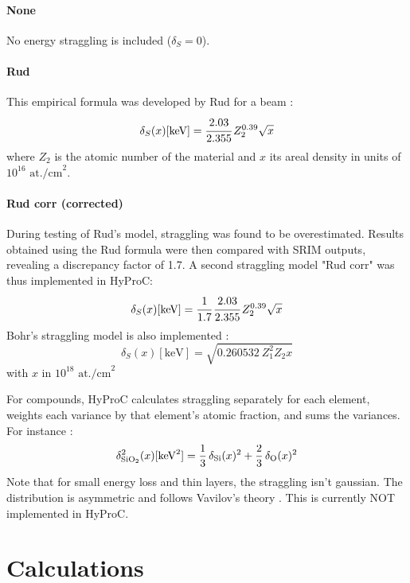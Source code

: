 \documentclass[11pt,a4paper]{article}
\begin{document}
\paragraph{None}
No energy straggling is included ($\delta_S=0$).
\paragraph{Rud}
This empirical formula was developed by Rud for a  beam \cite{rud1978measurements}:
\begin{equation}
    \delta_S(x)[\text{keV}] = \cfrac{2.03}{2.355}\, Z_2^{0.39} \sqrt{x}
    \label{eq:straggSD_Rud}
\end{equation}
where $Z_2$ is the atomic number of the material and $x$ its areal density in units of $10^{16} \text{ at./cm}^2$.
\paragraph{Rud corr (corrected)}
During testing of Rud's model, straggling was found to be overestimated. Results obtained using the Rud formula were then compared with SRIM outputs, revealing a discrepancy factor of 1.7. A second straggling model "Rud corr" was thus implemented in HyProC:
\begin{equation}
    \delta_S(x)[\text{keV}] = \cfrac{1}{1.7}\, \cfrac{2.03}{2.355}\, Z_2^{0.39} \sqrt{x}
    \label{eq:straggSD_Rudcorr}
\end{equation}
Bohr's straggling model is also implemented \cite{bohr1948penetration}:
\begin{equation}
    \delta_S(x)[\text{keV}] = \sqrt{0.260532\ Z_1^2 Z_2 x}
    \label{eq:straggSD_Bohr}
\end{equation}
with $x$ in $10^{18} \text{ at./cm}^2$

For compounds, HyProC calculates straggling separately for each element, weights each variance by that element's atomic fraction, and sums the variances. For instance \cite{wang2010handbook}:
\begin{equation}
    \delta_{\ce{SiO_2}}^2(x)[\text{keV}^2] = \frac{1}{3} \, \delta_{\ce{Si}}(x)^2 + \frac{2}{3}\, \delta_{\ce{O}}(x)^2
\end{equation}
Note that for small energy loss and thin layers, the straggling isn't gaussian. The distribution is asymmetric and follows Vavilov's theory \cite{vavilov1957ionization}. This is currently NOT implemented in HyProC.

\section{Calculations}
\end{document}

